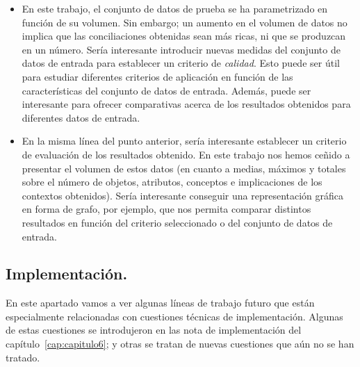 \begin{itemize}
	\item En este trabajo, el conjunto de datos de prueba se ha parametrizado en función de su volumen. Sin embargo; un aumento en el volumen de datos no implica que las conciliaciones obtenidas sean más ricas, ni que se produzcan en un número.  Sería interesante introducir nuevas medidas del conjunto de datos de entrada para establecer un criterio de \emph{calidad}. Esto puede ser útil para estudiar diferentes criterios de aplicación en función de las características del conjunto de datos de entrada. Además, puede ser interesante para ofrecer comparativas acerca de los resultados obtenidos para diferentes datos de entrada.

	\item En la misma línea del punto anterior, sería interesante establecer un criterio de evaluación de los resultados obtenido. En este trabajo nos hemos ceñido a presentar el volumen de estos datos (en cuanto a medias, máximos y totales sobre el número de objetos, atributos, conceptos e implicaciones de los contextos obtenidos). Sería interesante conseguir una representación gráfica en forma de grafo, por ejemplo, que nos permita comparar distintos resultados en función del criterio seleccionado o del conjunto de datos de entrada.

\end{itemize}






\subsection{Implementación.}

En este apartado vamos a ver algunas líneas de trabajo futuro que están especialmente relacionadas con cuestiones técnicas de implementación. Algunas de estas cuestiones se introdujeron en las nota de implementación del capítulo~\ref{cap:capitulo6}; y otras se tratan de nuevas cuestiones que aún no se han tratado.

